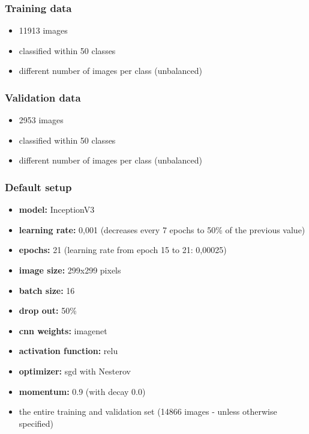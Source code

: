 \documentclass[10pt]{article}
\newif\ifen
\newif\ifde
\newcommand{\en}[1]{\ifen#1\fi}
\newcommand{\de}[1]{\ifde#1\fi}
\begin{document}
			\subsubsection*{Training data}
				\begin{itemize}
					\item 11913 images
					\item classified within 50 classes
					\item different number of images per class (unbalanced)
				\end{itemize}
			
			\subsubsection*{Validation data}
				\begin{itemize}
					\item 2953 images
					\item classified within 50 classes
					\item different number of images per class (unbalanced)
				\end{itemize}
				
			\subsubsection*{Default setup}
				\de{Mit Ausnahme der CNN-Modellversuche basierten alle Tests auf den folgenden Parametern (wobei ein Wert der Parameter je nach Kapitel variierte):}
				\en{With the exception of the cnn model tests, all tests were based on the following parameters
			(whereby one value of the parameters varied depending on the chapter):}
		
				\begin{itemize}
					\item \textbf{model:} InceptionV3
					\item \textbf{learning rate:} 0,001 (decreases every 7 epochs to 50\% of the previous value)
					\item \textbf{epochs:} 21 (learning rate from epoch 15 to 21: 0,00025)
					\item \textbf{image size:} 299x299 pixels
					\item \textbf{batch size:} 16
					\item \textbf{drop out:} 50\%
					\item \textbf{cnn weights:} imagenet
					\item \textbf{activation function:} relu
					\item \textbf{optimizer:} sgd with Nesterov
					\item \textbf{momentum:} 0.9 (with decay 0.0)
					\item the entire training and validation set (14866 images - unless otherwise specified)
				\end{itemize}
				
\end{document}
